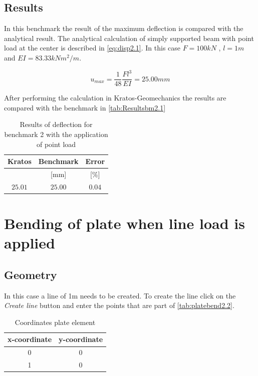 \documentclass{deltares_manual_style}
\begin{document}
\subsection{Results} 
In this benchmark the result of the maximum deflection is compared with the analytical result. The analytical
calculation of simply supported beam with point load at the center is described in \autoref{eq:disp2.1}. In this case $F = 100kN$ , 
$l = 1m$ and $EI = 83.33 kNm^{2}/m$.

\begin{equation}\label{eq:disp2.1}
u_{max} = \frac{1}{48} \frac{F l^{3}}{EI} = 25.00mm
\end{equation}

After performing the calculation in Kratos-Geomechanics the results are compared with the benchmark in \autoref{tab:Resultsbm2.1} 

\begin{table}[H]
	\caption{Results of deflection for benchmark 2 with the application of point load }
	\label{tab:Resultsbm2.1}
	\centering
		\begin{tabular}{|c|c|c|}
			\hline
			Kratos & Benchmark & Error\\ \hline
			[mm] & [mm] & [\%] \\ \hline  
			$25.01$ & $25.00$ & $0.04$ \\ \hline
		\end{tabular}
\end{table}

\section{Bending of plate when line load is applied}
\subsection{Geometry}
In this case a line of 1m needs to be created. To create the line click on the \textit{Create line} button and enter the 
points that are part of \autoref{tab:platebend2.2}.
\begin{table}[h]
	\caption{Coordinates plate element}
	\label{tab:platebend2.2}
	\centering
		\begin{tabular}{|c|c|}
			\hline
			x-coordinate & y-coordinate \\ \hline
			0 & 0 \\ \hline
			1 & 0 \\ \hline
		\end{tabular}
\end{table}
\end{document}
